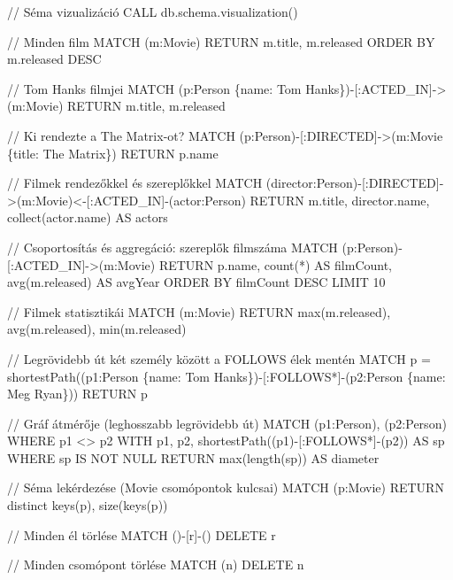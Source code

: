 \documentclass[
  magyar,
]{article}
\newenvironment{Shaded}{}{}
\newcommand{\NormalTok}[1]{#1}
\begin{document}
\begin{Shaded}
\begin{Highlighting}[]
\NormalTok{// Séma vizualizáció}
\NormalTok{CALL db.schema.visualization()}

\NormalTok{// Minden film}
\NormalTok{MATCH (m:Movie) RETURN m.title, m.released ORDER BY m.released DESC}

\NormalTok{// Tom Hanks filmjei}
\NormalTok{MATCH (p:Person \{name: \textquotesingle{}Tom Hanks\textquotesingle{}\}){-}[:ACTED\_IN]{-}\textgreater{}(m:Movie)}
\NormalTok{RETURN m.title, m.released}

\NormalTok{// Ki rendezte a The Matrix{-}ot?}
\NormalTok{MATCH (p:Person){-}[:DIRECTED]{-}\textgreater{}(m:Movie \{title: \textquotesingle{}The Matrix\textquotesingle{}\})}
\NormalTok{RETURN p.name}

\NormalTok{// Filmek rendezőkkel és szereplőkkel}
\NormalTok{MATCH (director:Person){-}[:DIRECTED]{-}\textgreater{}(m:Movie)\textless{}{-}[:ACTED\_IN]{-}(actor:Person)}
\NormalTok{RETURN m.title, director.name, collect(actor.name) AS actors}

\NormalTok{// Csoportosítás és aggregáció: szereplők filmszáma}
\NormalTok{MATCH (p:Person){-}[:ACTED\_IN]{-}\textgreater{}(m:Movie)}
\NormalTok{RETURN p.name, count(*) AS filmCount, avg(m.released) AS avgYear}
\NormalTok{ORDER BY filmCount DESC LIMIT 10}

\NormalTok{// Filmek statisztikái}
\NormalTok{MATCH (m:Movie)}
\NormalTok{RETURN max(m.released), avg(m.released), min(m.released)}

\NormalTok{// Legrövidebb út két személy között a FOLLOWS élek mentén}
\NormalTok{MATCH p = shortestPath((p1:Person \{name: \textquotesingle{}Tom Hanks\textquotesingle{}\}){-}[:FOLLOWS*]{-}(p2:Person \{name: \textquotesingle{}Meg Ryan\textquotesingle{}\}))}
\NormalTok{RETURN p}

\NormalTok{// Gráf átmérője (leghosszabb legrövidebb út)}
\NormalTok{MATCH (p1:Person), (p2:Person)}
\NormalTok{WHERE p1 \textless{}\textgreater{} p2}
\NormalTok{WITH p1, p2, shortestPath((p1){-}[:FOLLOWS*]{-}(p2)) AS sp}
\NormalTok{WHERE sp IS NOT NULL}
\NormalTok{RETURN max(length(sp)) AS diameter}

\NormalTok{// Séma lekérdezése (Movie csomópontok kulcsai)}
\NormalTok{MATCH (p:Movie) RETURN distinct keys(p), size(keys(p))}

\NormalTok{// Minden él törlése}
\NormalTok{MATCH (){-}[r]{-}() DELETE r}

\NormalTok{// Minden csomópont törlése}
\NormalTok{MATCH (n) DELETE n}
\end{Highlighting}
\end{Shaded}
\end{document}
